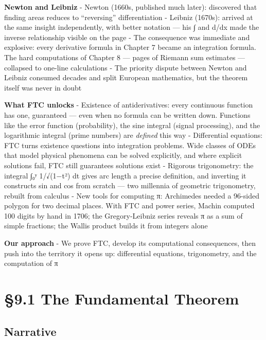 \documentclass[
  10pt,
  letterpaper,
]{scrbook}
\begin{document}
\textbf{Newton and Leibniz} - Newton (1660s, published much later):
discovered that finding areas reduces to ``reversing'' differentiation -
Leibniz (1670s): arrived at the same insight independently, with better
notation --- his ∫ and d/dx made the inverse relationship visible on the
page - The consequence was immediate and explosive: every derivative
formula in Chapter 7 became an integration formula. The hard
computations of Chapter 8 --- pages of Riemann sum estimates ---
collapsed to one-line calculations - The priority dispute between Newton
and Leibniz consumed decades and split European mathematics, but the
theorem itself was never in doubt

\textbf{What FTC unlocks} - Existence of antiderivatives: every
continuous function has one, guaranteed --- even when no formula can be
written down. Functions like the error function (probability), the sine
integral (signal processing), and the logarithmic integral (prime
numbers) are \emph{defined} this way - Differential equations: FTC turns
existence questions into integration problems. Wide classes of ODEs that
model physical phenomena can be solved explicitly, and where explicit
solutions fail, FTC still guarantees solutions exist - Rigorous
trigonometry: the integral ∫₀ʸ 1/√(1−t²) dt gives arc length a precise
definition, and inverting it constructs sin and cos from scratch --- two
millennia of geometric trigonometry, rebuilt from calculus - New tools
for computing π: Archimedes needed a 96-sided polygon for two decimal
places. With FTC and power series, Machin computed 100 digits by hand in
1706; the Gregory-Leibniz series reveals π as a sum of simple fractions;
the Wallis product builds it from integers alone

\textbf{Our approach} - We prove FTC, develop its computational
consequences, then push into the territory it opens up: differential
equations, trigonometry, and the computation of π

\section{§9.1 The Fundamental Theorem}\label{the-fundamental-theorem}

\subsection{Narrative}\label{narrative-38}
\end{document}
